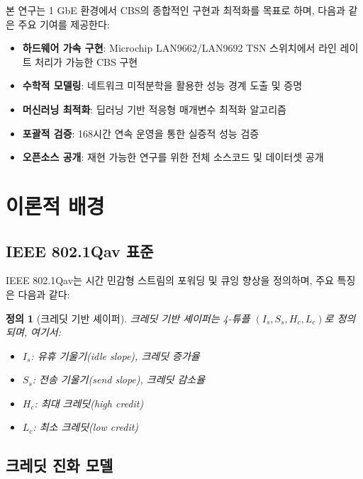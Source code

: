 \documentclass[12pt, a4paper]{article}
\newtheorem{definition}[theorem]{정의}
\begin{document}
본 연구는 1 GbE 환경에서 CBS의 종합적인 구현과 최적화를 목표로 하며, 다음과 같은 주요 기여를 제공한다:

\begin{itemize}
    \item \textbf{하드웨어 가속 구현}: Microchip LAN9662/LAN9692 TSN 스위치에서 라인 레이트 처리가 가능한 CBS 구현
    
    \item \textbf{수학적 모델링}: 네트워크 미적분학을 활용한 성능 경계 도출 및 증명
    
    \item \textbf{머신러닝 최적화}: 딥러닝 기반 적응형 매개변수 최적화 알고리즘
    
    \item \textbf{포괄적 검증}: 168시간 연속 운영을 통한 실증적 성능 검증
    
    \item \textbf{오픈소스 공개}: 재현 가능한 연구를 위한 전체 소스코드 및 데이터셋 공개
\end{itemize}

\section{이론적 배경}

\subsection{IEEE 802.1Qav 표준}

IEEE 802.1Qav는 시간 민감형 스트림의 포워딩 및 큐잉 향상을 정의하며, 주요 특징은 다음과 같다:

\begin{definition}[크레딧 기반 셰이퍼]
크레딧 기반 셰이퍼는 4-튜플 $(I_s, S_s, H_c, L_c)$로 정의되며, 여기서:
\begin{itemize}
    \item $I_s$: 유휴 기울기(idle slope), 크레딧 증가율
    \item $S_s$: 전송 기울기(send slope), 크레딧 감소율
    \item $H_c$: 최대 크레딧(high credit)
    \item $L_c$: 최소 크레딧(low credit)
\end{itemize}
\end{definition}

\subsection{크레딧 진화 모델}
\end{document}
